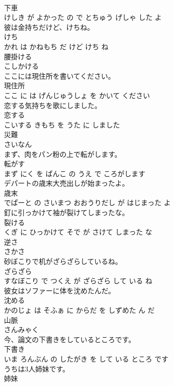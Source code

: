 \documentclass[8pt]{extreport}
\begin{document}
\begin{CJK}{UTF8}{min}
\\	下車 
\\	けしき が よかった の で とちゅう げしゃ した よ			
\\	彼は金持ちだけど、けちね。	
\\	けち 
\\	かれ は かねもち だ けど けち ね			
\\	腰掛ける	
\\	こしかける		
\\	ここには現住所を書いてください。	
\\	現住所 
\\	ここ に は げんじゅうしょ を かいて ください			
\\	恋する気持ちを歌にしました。	
\\	恋する 
\\	こいする きもち を うた に しました			
\\	災難	
\\	さいなん		
\\	まず、肉をパン粉の上で転がします。	
\\	転がす 
\\	まず にく を ぱんこ の うえ で ころがします			
\\	デパートの歳末大売出しが始まったよ。	
\\	歳末 
\\	でぱーと の さいまつ おおうりだし が はじまった よ			
\\	釘に引っかけて袖が裂けてしまったな。	
\\	裂ける 
\\	くぎ に ひっかけて そで が さけて しまった な			
\\	逆さ	
\\	さかさ		
\\	砂ぼこりで机がざらざらしているね。	
\\	ざらざら 
\\	すなぼこり で つくえ が ざらざら して いる ね			
\\	彼女はソファーに体を沈めたんだ。	
\\	沈める 
\\	かのじょ は そふぁ に からだ を しずめた ん だ			
\\	山脈	
\\	さんみゃく		
\\	今、論文の下書きをしているところです。	
\\	下書き 
\\	いま ろんぶん の したがき を して いる ところ です			
\\	うちは3人姉妹です。	
\\	姉妹 

\end{CJK}
\end{document}
